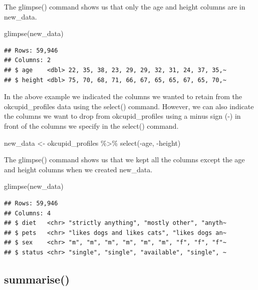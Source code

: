 \documentclass[
]{krantz}
\makeatletter
\newenvironment{Shaded}{\begin{snugshade}}{\end{snugshade}}
\newcommand{\FunctionTok}[1]{\textcolor[rgb]{0,0,0}{#1}}
\newcommand{\NormalTok}[1]{#1}
\newcommand{\OtherTok}[1]{\textcolor[rgb]{0.37,0.37,0.37}{#1}}
\newcommand{\SpecialCharTok}[1]{\textcolor[rgb]{0,0,0}{#1}}
\newenvironment{kframe}{%
\medskip{}
\setlength{\fboxsep}{.8em}
 \def\at@end@of@kframe{}%
 \ifinner\ifhmode%
  \def\at@end@of@kframe{\end{minipage}}%
  \begin{minipage}{\columnwidth}%
 \fi\fi%
 \def\FrameCommand##1{\hskip\@totalleftmargin \hskip-\fboxsep
 \colorbox{shadecolor}{##1}\hskip-\fboxsep
     \hskip-\linewidth \hskip-\@totalleftmargin \hskip\columnwidth}%
 \MakeFramed {\advance\hsize-\width
   \@totalleftmargin\z@ \linewidth\hsize
   \@setminipage}}%
 {\par\unskip\endMakeFramed%
 \at@end@of@kframe}
\renewenvironment{Shaded}{\begin{kframe}}{\end{kframe}}
\makeatother
\begin{document}
The glimpse() command shows us that only the age and height columns are in new\_data.

\begin{Shaded}
\begin{Highlighting}[]
\FunctionTok{glimpse}\NormalTok{(new\_data)}
\end{Highlighting}
\end{Shaded}

\begin{verbatim}
## Rows: 59,946
## Columns: 2
## $ age    <dbl> 22, 35, 38, 23, 29, 29, 32, 31, 24, 37, 35,~
## $ height <dbl> 75, 70, 68, 71, 66, 67, 65, 65, 67, 65, 70,~
\end{verbatim}

In the above example we indicated the columns we wanted to retain from the okcupid\_profiles data using the select() command. However, we can also indicate the columns we want to drop from okcupid\_profiles using a minus sign (-) in front of the columns we specify in the select() command.

\begin{Shaded}
\begin{Highlighting}[]
\NormalTok{new\_data }\OtherTok{\textless{}{-}}\NormalTok{ okcupid\_profiles }\SpecialCharTok{\%\textgreater{}\%} \FunctionTok{select}\NormalTok{(}\SpecialCharTok{{-}}\NormalTok{age, }\SpecialCharTok{{-}}\NormalTok{height)}
\end{Highlighting}
\end{Shaded}

The glimpse() command shows us that we kept all the columns except the age and height columns when we created new\_data.

\begin{Shaded}
\begin{Highlighting}[]
\FunctionTok{glimpse}\NormalTok{(new\_data)}
\end{Highlighting}
\end{Shaded}

\begin{verbatim}
## Rows: 59,946
## Columns: 4
## $ diet   <chr> "strictly anything", "mostly other", "anyth~
## $ pets   <chr> "likes dogs and likes cats", "likes dogs an~
## $ sex    <chr> "m", "m", "m", "m", "m", "m", "f", "f", "f"~
## $ status <chr> "single", "single", "available", "single", ~
\end{verbatim}

\hypertarget{summarise}{%
\subsection{summarise()}\label{summarise}}
\end{document}
